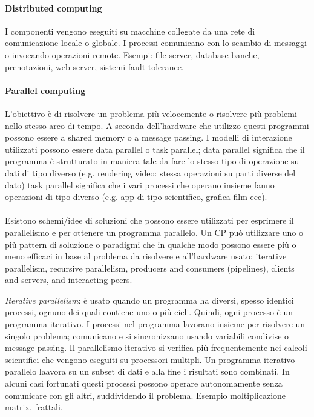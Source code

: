\documentclass[10pt,a4paper]{book}
\begin{document}
\paragraph{Distributed computing} I componenti vengono eseguiti su macchine collegate da una rete di comunicazione locale o globale. I processi comunicano con lo scambio di messaggi o invocando operazioni remote.
Esempi: file server, database banche, prenotazioni, web server, sistemi fault tolerance.

\paragraph{Parallel computing} L'obiettivo è di risolvere un problema più velocemente o risolvere più problemi nello stesso arco di tempo. A seconda dell'hardware che utilizzo questi programmi possono essere a shared memory o a message passing. I modelli di interazione utilizzati possono essere data parallel o task parallel;
data parallel significa che il programma è strutturato in maniera tale da fare lo stesso tipo di operazione su dati di tipo diverso (e.g. rendering video: stessa operazioni su parti diverse del dato)
task parallel significa che i vari processi che operano insieme fanno operazioni di tipo diverso (e.g. app di tipo scientifico, grafica film ecc).
\\
\\
Esistono schemi/idee di soluzioni che possono essere utilizzati per esprimere il parallelismo e per ottenere un programma parallelo. Un CP può utilizzare uno o più pattern di soluzione o paradigmi che in qualche modo possono essere più o meno efficaci in base al problema da risolvere e all'hardware usato: iterative parallelism, recursive parallelism, producers and consumers (pipelines), clients and servers, and interacting peers.

\textit{Iterative parallelism}: è usato quando un programma ha diversi, spesso identici processi, ognuno dei quali contiene uno o più cicli. Quindi, ogni processo è un programma iterativo. I processi nel programma lavorano insieme per risolvere un singolo problema; comunicano e si sincronizzano usando variabili condivise o message passing. Il parallelismo iterativo si verifica più frequentemente nei calcoli scientifici che vengono eseguiti su processori multipli.
Un programma iterativo parallelo laavora su un subset di dati e alla fine i risultati sono combinati.
In alcuni casi fortunati questi processi possono operare autonomamente senza comunicare con gli altri, suddividendo il problema. Esempio moltiplicazione matrix, frattali.
\end{document}

